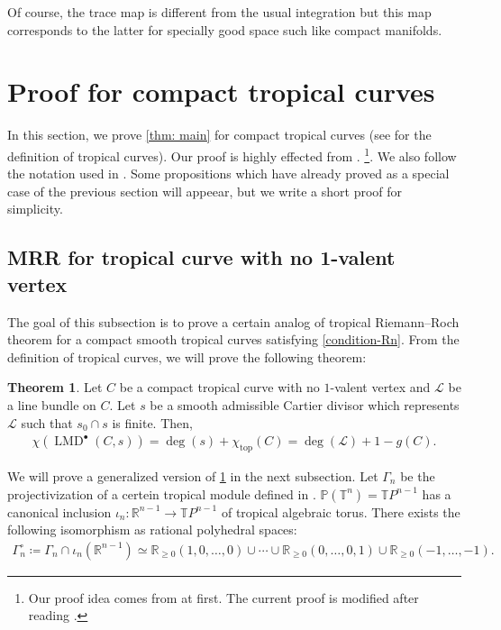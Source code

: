 \documentclass[a4paper,dvipdfmx,reqno,12pt]{amsart}
\theoremstyle{definition}
\newtheorem{theorem}{Theorem}[section]
\newcommand{\deq}{\coloneqq}
\newcommand{\opn}[1]{\operatorname{#1}}
\numberwithin{equation}{section}
\begin{document}
Of course, the trace map is different from the usual integration 
but this map corresponds to the latter 
for specially good space such like compact manifolds.

\section{Proof for compact tropical curves}
In this section, we prove \cref{thm: main} for 
compact tropical curves
(see \cite[Definition 3.1]{mikhalkinTropicalCurvesTheir2008a} 
for the definition of tropical curves).
Our proof is highly effected from 
\cite{knill2012graph,MR2676658,auroux2022lagrangian}.
\footnote{Our proof idea comes from 
\cite{knill2012graph,MR2676658} at first.  
The current proof is modified after reading 
\cite{auroux2022lagrangian}.}.
We also follow the notation used in 
\cite{auroux2022lagrangian}.
Some propositions which have already proved as a special case
of the previous section will appeear, but we write a short proof 
for simplicity.

\subsection{MRR for tropical curve with no 1-valent
vertex}

The goal of this subsection is to prove a certain 
analog of tropical Riemann--Roch theorem for
a compact smooth tropical 
curves satisfying \cref{condition-Rn}. 
From the definition of tropical curves, we will prove
the following theorem:
\begin{theorem}
\label{theorem-MRR-metric-graph}
Let $C$ be a compact tropical curve with 
no $1$-valent vertex and 
$\mathcal{L}$ be a line bundle on $C$.
Let $s$ be a smooth admissible Cartier divisor which
represents $\mathcal{L}$ such that 
$s_0\cap s$ is finite. Then,
\begin{align}
  \chi(\opn{LMD}^{\bullet}(C,s))=\opn{deg}(s)+
\chi_{\opn{top}}(C)=\opn{deg}(\mathcal{L})+1-g(C).
\end{align}
\end{theorem}
We will prove a generalized version of 
\cref{theorem-MRR-metric-graph} in the next subsection.
Let $\Gamma_{n}$ be the projectivization of 
a certein tropical module defined in 
\cite[2.2]{mikhalkinTropicalCurvesTheir2008a}.
$\mathbb{P}(\mathbb{T}^{n})=\mathbb{T}P^{n-1}$ has a canonical inclusion
$\iota_n\colon \mathbb{R}^{n-1}\to 
\mathbb{T}P^{n-1}$ 
of tropical algebraic torus.
There exists the following isomorphism as rational 
polyhedral spaces:
\begin{align}
\Gamma_{n}^{\circ}\deq \Gamma_{n}\cap \iota_n(\mathbb{R}^{n-1}) \simeq \mathbb{R}_{\geq 0}(1,0,\ldots,0)\cup \cdots
\cup {\mathbb{R}}_{\geq 0}(0,\ldots,0,1)\cup 
{\mathbb{R}}_{\geq 0}(-1,\ldots,-1).
\end{align}
\end{document}
